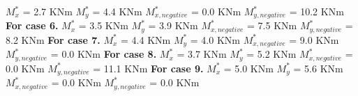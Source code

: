 \documentclass{article}%
\begin{document}
$M_{x}^{*}$ = 2.7 KNm%
\newline%
\newline%
%
$M_{y}^{*}$ = 4.4 KNm%
\newline%
\newline%
%
$M_{x,negative}^{*}$ = 0.0 KNm%
\newline%
\newline%
%
$M_{y,negative}^{*}$ = 10.2 KNm%
\newline%
\newline%
%
\textbf{For case 6.\newline%
\newline%
}%
$M_{x}^{*}$ = 3.5 KNm%
\newline%
\newline%
%
$M_{y}^{*}$ = 3.9 KNm%
\newline%
\newline%
%
$M_{x,negative}^{*}$ = 7.5 KNm%
\newline%
\newline%
%
$M_{y,negative}^{*}$ = 8.2 KNm%
\newline%
\newline%
%
\textbf{For case 7.\newline%
\newline%
}%
$M_{x}^{*}$ = 4.4 KNm%
\newline%
\newline%
%
$M_{y}^{*}$ = 4.0 KNm%
\newline%
\newline%
%
$M_{x,negative}^{*}$ = 9.0 KNm%
\newline%
\newline%
%
$M_{y,negative}^{*}$ = 0.0 KNm%
\newline%
\newline%
%
\textbf{For case 8.\newline%
\newline%
}%
$M_{x}^{*}$ = 3.7 KNm%
\newline%
\newline%
%
$M_{y}^{*}$ = 5.2 KNm%
\newline%
\newline%
%
$M_{x,negative}^{*}$ = 0.0 KNm%
\newline%
\newline%
%
$M_{y,negative}^{*}$ = 11.1 KNm%
\newline%
\newline%
%
\textbf{For case 9.\newline%
\newline%
}%
$M_{x}^{*}$ = 5.0 KNm%
\newline%
\newline%
%
$M_{y}^{*}$ = 5.6 KNm%
\newline%
\newline%
%
$M_{x,negative}^{*}$ = 0.0 KNm%
\newline%
\newline%
%
$M_{y,negative}^{*}$ = 0.0 KNm%
\newline%
\newline%

%
\end{document}
